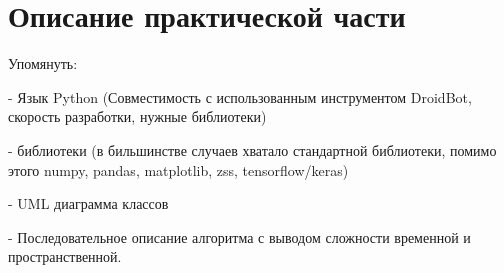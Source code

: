 \section{Описание практической части}
\label{sec:Chapter4} 

Упомянуть:

- Язык Python (Совместимость с использованным инструментом DroidBot, скорость разработки, нужные библиотеки)

- библиотеки (в бильшинстве случаев хватало стандартной библиотеки, помимо этого numpy, pandas, matplotlib, zss, tensorflow/keras)

- UML диаграмма классов

- Последовательное описание алгоритма с выводом сложности временной и пространственной.

